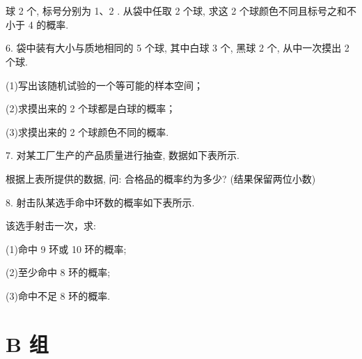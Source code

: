\documentclass[10pt]{article}
\begin{document}
\section*{}

\section*{}

球 2 个, 标号分别为 1、2 . 从袋中任取 2 个球, 求这 2 个球颜色不同且标号之和不小于 4 的概率.

6. 袋中装有大小与质地相同的 5 个球, 其中白球 3 个, 黑球 2 个, 从中一次摸出 2 个球.

(1)写出该随机试验的一个等可能的样本空间；

(2)求摸出来的 2 个球都是白球的概率；

(3)求摸出来的 2 个球颜色不同的概率.

7. 对某工厂生产的产品质量进行抽查, 数据如下表所示.

\begin{center}
\end{center}

根据上表所提供的数据, 问: 合格品的概率约为多少? (结果保留两位小数)

8. 射击队某选手命中环数的概率如下表所示.

\begin{center}
\end{center}

该选手射击一次，求:

(1)命中 9 环或 10 环的概率;

(2)至少命中 8 环的概率;

(3)命中不足 8 环的概率.

\section*{B 组}
\end{document}
